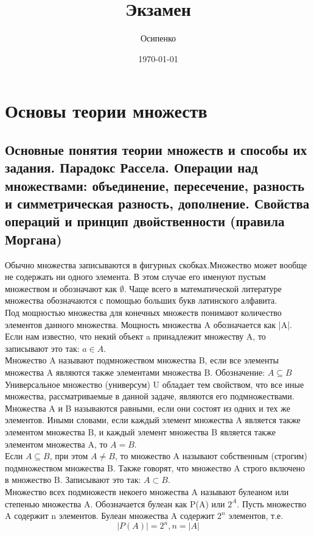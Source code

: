 \documentclass[a4paper, 12pt]{article}
\title{Экзамен}
\author{Осипенко}
\date{\today}
\begin{document}
\sffamily
\maketitle
\section{Основы теории множеств}
\subsection{Основные понятия теории множеств и способы их задания. Парадокс Рассела. Операции над множествами: объединение, пересечение, разность и симметрическая разность, дополнение. Свойства операций и принцип двойственности (правила Моргана)}
Обычно множества записываются в фигурных скобках.Множество может вообще не содержать ни одного элемента. В этом случае его именуют пустым множеством и обозначают как $ \emptyset $. Чаще всего в математической литературе множества обозначаются с помощью больших букв латинского алфавита.\\
Под мощностью множества для конечных множеств понимают количество элементов данного множества. Мощность множества A обозначается как |A|.\\
Если нам известно, что некий объект a принадлежит множеству A, то записывают это так: $ a \in A $.\\
Множество A называют подмножеством множества B, если все элементы множества A являются также элементами множества B. Обозначение: $ A \subseteq B $\\
Универсальное множество (универсум) U обладает тем свойством, что все иные множества, рассматриваемые в данной задаче, являются его подмножествами.\\
Множества A и B называются равными, если они состоят из одних и тех же элементов. Иными словами, если каждый элемент множества A является также элементом множества B, и каждый элемент множества B является также элементом множества A, то $ A = B $.\\
Если $ A \subseteq B $, при этом $ A \neq B $, то множество A называют собственным (строгим) подмножеством множества B. Также говорят, что множество A строго включено в множество B. Записывают это так: $ A \subset B $.\\
Множество всех подмножеств некоего множества A называют булеаном или степенью множества A. Обозначается булеан как P(A) или $ 2^A $. Пусть множество A содержит n элементов. Булеан множества A содержит $ 2^n $ элементов, т.е.
\[
       |P(A)| = 2^n, n = |A|
\]
\end{document}
